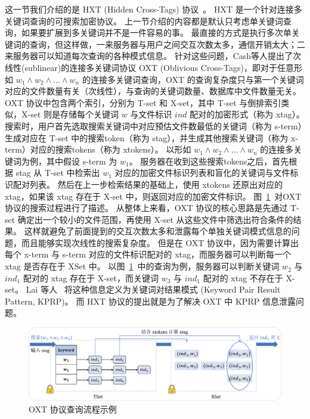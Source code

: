这一节我们介绍的是 HXT (Hidden Cross-Tags) 协议~\cite{lai2018result}。
HXT 是一个针对连接多关键词查询的可搜索加密协议。
上一节介绍的内容都是默认只考虑单关键词查询，如果要扩展到多关键词并不是一件容易的事。
最直接的方式是执行多次单关键词的查询，但这样做，一来服务器与用户之间交互次数太多，通信开销太大；二来服务器可以知道每次查询的各种模式信息。
针对这些问题，Cash等人提出了次线性(sublinear)的连接多关键词协议 OXT (Oblivious Cross-Tags)，即对于任意形如 $w_1\land w_2 \land \dots \land w_n$ 的连接多关键词查询，OXT 的查询复杂度只与第一个关键词对应的文件数量有关（次线性），与查询的关键词数量、数据库中文件数量无关。
OXT 协议中包含两个索引，分别为 T-set 和 X-set，其中 T-set 与倒排索引类似，X-set 则是存储每个关键词 $w$ 与文件标识 $ind$ 配对的加密形式（称为 xtag）。
搜索时，用户首先选取搜索关键词中对应预估文件数最低的关键词（称为 s-term）生成对应在 T-set 中的搜索token（称为 stag），并生成其他搜索关键词（称为 x-term）对应的搜索tokens（称为 xtokens）。
以形如 $w_1 \land w_2 \land \dots \land w_n$ 的连接多关键词为例，其中假设 s-term 为 $w_1$。
服务器在收到这些搜索tokens之后，首先根据 stag 从 T-set 中检索出 $w_1$ 对应的加密文件标识列表和盲化的关键词与文件标识配对列表。
然后在上一步检索结果的基础上，使用 xtokens 还原出对应的 xtag，如果该 xtag 存在于 X-set 中，则返回对应的加密文件标识。
图~\ref{fig:oxt_example}~对OXT协议的搜索过程进行了描述。
从整体上来看，OXT 协议的核心思路是先通过 T-set 确定出一个较小的文件范围，再使用 X-set 从这些文件中筛选出符合条件的结果。
这样就避免了前面提到的交互次数太多和泄露每个单独关键词模式信息的问题，而且能够实现次线性的搜索复杂度。
但是在 OXT 协议中，因为需要计算出每个 x-term 与 s-term 对应的文件标识配对的 xtag，而服务器可以判断每一个 xtag 是否存在于 XSet 中。
以图~\ref{fig:oxt_example}~中的查询为例，服务器可以判断关键词 $w_2$ 与 $ind_1$ 配对的 xtag 存在于 X-set，而关键词 $w_3$ 与 $ind_1$ 配对的 xtag 不存在于 X-set。
Lai 等人~\cite{lai2018result} 将这种信息定义为关键词对结果模式 (Keyword Pair Result Pattern, KPRP)。
而 HXT 协议的提出就是为了解决 OXT 中 KPRP 信息泄露问题。
\begin{figure}[ht]
  \centering
  \includegraphics[width=\textwidth]{figures/OXT_exp.pdf}
  \caption{OXT 协议查询流程示例}
  \label{fig:oxt_example}
\end{figure}

